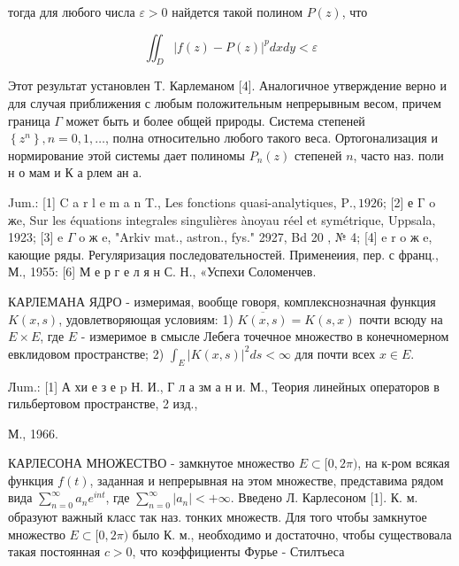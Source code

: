 \documentclass[10pt]{article}
\begin{document}
тогда для любого числа $\varepsilon>0$ найдется такой полином $P(z)$, что



\[

\iint_{D}|f(z)-P(z)|^{p} d x d y<\varepsilon

\]



Этот результат установлен Т. Карлеманом [4]. Аналогичное утверждение верно и для случая приближения с любым положительным непрерывным весом, причем граница $\Gamma$ может быть и более общей природы. Система степеней $\left\{z^{n}\right\}, n=0,1, \ldots$, полна относительно любого такого веса. Ортогонализация и нормирование этой системы дает полиномы $P_{n}(z)$ степеней $n$, часто наз. поли н о мам и К а рлем ан а.



Jum.: [1] C a r l e m a n T., Les fonctions quasi-analytiques, $\mathrm{P} ., 1926$; [2] е $\mathrm{\Gamma}$ o жe, Sur les équations integrales singulières ànoyau réel et symétrique, Uppsala, 1923; [3] e $\Gamma$ o ж e, "Arkiv mat., astron., fys." 2927, Bd 20 , № 4; [4] e r o ж e, кающие ряды. Регуляризация последовательностей. Применеиия, пер. с франц., М., 1955: [6] М е р г е л я н С. Н., «Успехи Соломенчев.



КАРЛЕМАНА ЯДРО - измеримая, вообще говоря, комплекснозначная функция $K(x, s)$, удовлетворяющая условиям: 1) $\overline{K(x, s)}=K(s, x)$ почти всюду на $E \times E$, где $E$ - измеримое в смысле Лебега точечное множество в конечномерном евклидовом пространстве; 2) $\int_{E}|K(x, s)|^{2} d s<\infty$ для почти всех $x \in E$.



Лum.: [1] А хи е з е p Н. И., Г л а зм а н и. М., Теория линейных операторов в гильбертовом пространстве, 2 изд.,

М., 1966.



КАРЛЕСОНА МНОЖЕСТВО - замкнутое множество $E \subset[0,2 \pi)$, на к-ром всякая функция $f(t)$, заданная и непрерывная на этом множестве, представима рядом вида $\sum_{n=0}^{\infty} a_{n} e^{i n t}$, где $\sum_{n=0}^{\infty}\left|a_{n}\right|<+\infty$. Введено Л. Карлесоном [1]. К. м. образуют важный класс так наз. тонких множеств. Для того чтобы замкнутое множество $E \subset[0,2 \pi)$ было К. м., необходимо и достаточно, чтобы существовала такая постоянная $c>0$, что коэффициенты Фурье - Стилтьеса
\end{document}

